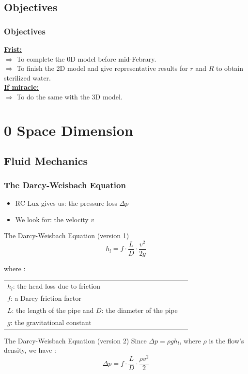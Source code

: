 \documentclass[xcolor=dvipsnames,10pt]{beamer}
\begin{document}
\subsection{Objectives}
\begin{frame}
\frametitle{Objectives}
\underline{\textbf{\color{blue}Frist:}}\\
\vspace{5mm}
$\Rightarrow$ To complete the 0D model before mid-Febrary.\\
\vspace{4mm}
$\Rightarrow$ To finish the 2D model and give representative results for $r$ and $R$ to obtain sterilized water.\\
\vspace{8mm}
\underline{\textbf{\color{blue}If miracle:}}\\
\vspace{5mm}
$\Rightarrow$ To do the same with the 3D model.\end{frame}



\section{0 Space Dimension}

\subsection{Fluid Mechanics}

\begin{frame}
	\frametitle{The Darcy-Weisbach Equation}
		{\footnotesize
		\begin{itemize}
			\item RC-Lux gives us: the pressure loss $\Delta p$ 
			\item We look for: the velocity $v$ 
		\end{itemize}
		\begin{block}{The Darcy-Weisbach Equation (version 1)}
			\begin{equation}
				h_l = f \cdot \frac{L}{D} \cdot \frac{v^2}{2g}
			\end{equation}
		\end{block}
		where : 
	\begin{tabular}{ll}
		$h_l$: the head loss due to friction\\
		$f$: a Darcy friction factor\\
		$L$: the length of the pipe and $D$: the diameter of the pipe\\
		$g$: the gravitational constant
	\end{tabular}
		\begin{block}{The Darcy-Weisbach Equation (version 2)}
			Since $\Delta p = \rho g h_l$, where $\rho$ is the flow's density, we have :
			\begin{equation}
				\Delta p = f \cdot \frac{L}{D} \cdot \frac{\rho v^2}{2}
			\end{equation}
		\end{block}
}
\end{frame}
\end{document}
